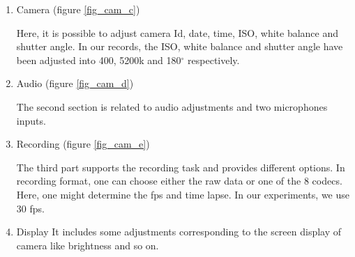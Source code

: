 \documentclass[[12pt,DIV14,BCOR12mm,a4paper,footexclude,headinclude,halfparskip-,twoside,openright,cleardoubleempty,idxtotoc,bibtotoc]{article}
\begin{document}
\begin{enumerate}

	\item Camera (figure \ref{fig_cam_c})

	Here, it is possible to adjust camera Id, date, time, ISO, white balance and shutter angle. In our records, the ISO, white balance and shutter angle have been adjusted into 400, 5200k and 180$^{\circ}$ respectively.

	\item Audio (figure \ref{fig_cam_d})

	The second section is related to audio adjustments and two microphones inputs.

	\item Recording (figure \ref{fig_cam_e})

	The third part supports the recording task and provides different options. In recording format, one can choose either the raw data or one of the 8 codecs. Here, one might determine the fps and time lapse. In our experiments, we use 30 fps.	

	\item Display
	It includes some adjustments corresponding to the screen display of camera like brightness and so on.


\end{enumerate}
\end{document}
